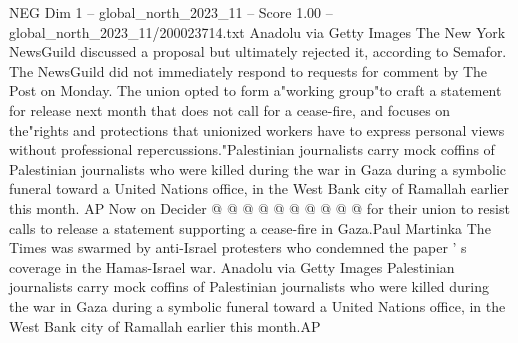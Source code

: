 \begin{textsample}{NEG Dim 1 – global\_north\_2023\_11 – Score 1.00 – global\_north\_2023\_11/200023714.txt}
Anadolu via Getty Images The New York NewsGuild discussed a proposal but ultimately rejected it, according to Semafor.
The NewsGuild did not immediately respond to requests for comment by The Post on Monday.
The union opted to form a"working group"to craft a statement for release next month that does not call for a cease-fire, and focuses on the"rights and protections that unionized workers have to express personal views without professional repercussions."Palestinian journalists carry mock coffins of Palestinian journalists who were killed during the war in Gaza during a symbolic funeral toward a United Nations office, in the West Bank city of Ramallah earlier this month.
AP Now on Decider @ @ @ @ @ @ @ @ @ @ for their union to resist calls to release a statement supporting a cease-fire in Gaza.Paul Martinka The Times was swarmed by anti-Israel protesters who condemned the paper ' s coverage in the Hamas-Israel war.
Anadolu via Getty Images Palestinian journalists carry mock coffins of Palestinian journalists who were killed during the war in Gaza during a symbolic funeral toward a United Nations office, in the West Bank city of Ramallah earlier this month.AP

\end{textsample}
